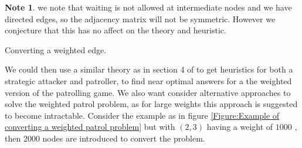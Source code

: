 \documentclass[a4paper,10pt]{article}
\theoremstyle{definition}
\theoremstyle{definition}
\theoremstyle{remark}
\theoremstyle{definition}
\newtheorem*{note}{Note}
\begin{document}
\begin{note} 
we note that waiting is not allowed at intermediate nodes and we have directed edges, so the adjacency matrix will not be symmetric. However we conjecture that this has no affect on the theory and heuristic.
\end{note}

\begin{myfigure}
\begin{center}
\end{center}
\caption{Converting a weighted edge.}
\label{Figure:Example of converting a weighted patrol problem}
\end{myfigure}

We could then use a similar theory as in section 4 of \cite{Lin2013} to get heuristics for both a strategic attacker and patroller, to find near optimal answers for a the weighted version of the patrolling game. We also want consider alternative approaches to solve the weighted patrol problem, as for large weights this approach is suggested to become intractable. Consider the example as in figure \ref{Figure:Example of converting a weighted patrol problem} but with $(2,3)$ having a weight of $1000$ , then $2000$ nodes are introduced to convert the problem.
\end{document}

